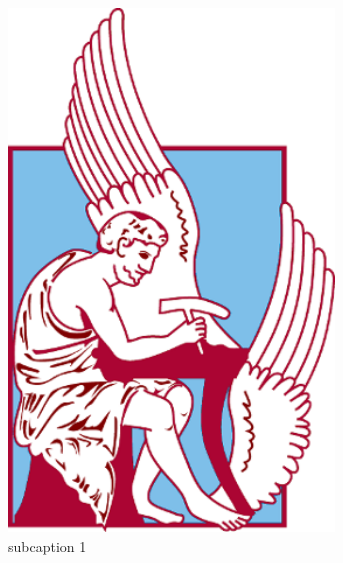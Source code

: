 \begin{figure}[h]
	\centering
	\begin{subfigure}{.5\textwidth}
		\centering
		\includegraphics[width=0.95\textwidth]{Images/university.png}
		\caption{subcaption 1}
		\label{circ:1_phase_D}
	\end{subfigure}%
	\begin{subfigure}{.5\textwidth}
		\centering

\end{subfigure}
\end{figure}
